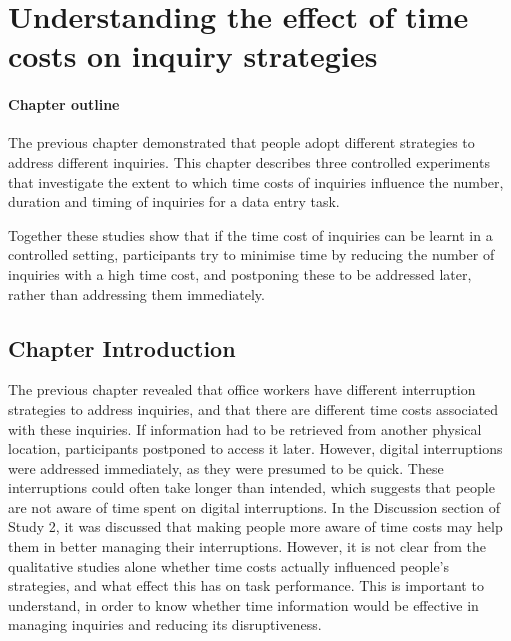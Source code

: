 \chapter{Understanding the effect of time costs on inquiry strategies}

\begin{mynote}
\subsubsection{Chapter outline}
The previous chapter demonstrated that people adopt different strategies to address different inquiries. This chapter describes three controlled experiments that investigate the extent to which time costs of inquiries influence the number, duration and timing of inquiries for a data entry task. 


Together these studies show that if the time cost of inquiries can be learnt in a controlled setting, participants try to minimise time by reducing the number of inquiries with a high time cost, and postponing these to be addressed later, rather than addressing them immediately. 

\end{mynote}
 
 \section{Chapter Introduction}
The previous chapter revealed that office workers have different interruption strategies to address inquiries, and that there are different time costs associated with these inquiries. If information had to be retrieved from another physical location, participants postponed to access it later. However, digital interruptions were addressed immediately, as they were presumed to be quick. These interruptions could often take longer than intended, which suggests that people are not aware of time spent on digital interruptions. In the Discussion section of Study 2, it was discussed that making people more aware of time costs may help them in better managing their interruptions. However, it is not clear from the qualitative studies alone whether time costs actually influenced people’s strategies, and what effect this has on task performance. This is important to understand, in order to know whether time information would be effective in managing inquiries and reducing its disruptiveness.

